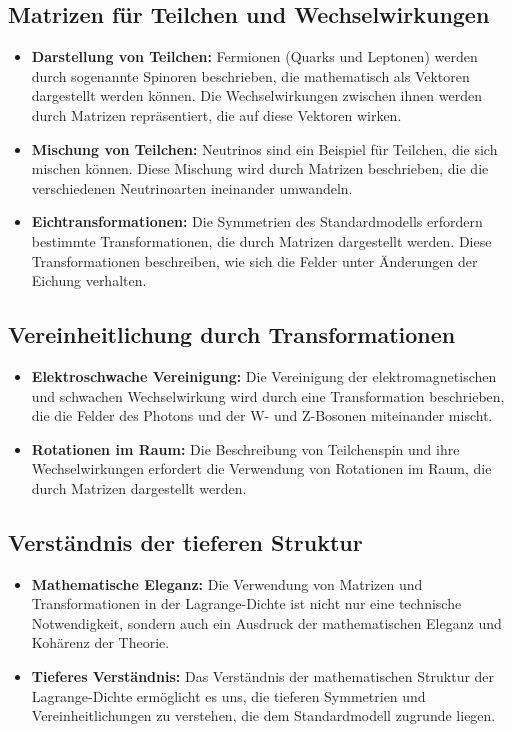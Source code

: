 \documentclass{article}
\begin{document}
	\subsection{Matrizen für Teilchen und Wechselwirkungen}
	
	\begin{itemize}
		\item \textbf{Darstellung von Teilchen:} Fermionen (Quarks und Leptonen) werden durch sogenannte Spinoren beschrieben, die mathematisch als Vektoren dargestellt werden können. Die Wechselwirkungen zwischen ihnen werden durch Matrizen repräsentiert, die auf diese Vektoren wirken.
		\item \textbf{Mischung von Teilchen:} Neutrinos sind ein Beispiel für Teilchen, die sich mischen können. Diese Mischung wird durch Matrizen beschrieben, die die verschiedenen Neutrinoarten ineinander umwandeln.
		\item \textbf{Eichtransformationen:} Die Symmetrien des Standardmodells erfordern bestimmte Transformationen, die durch Matrizen dargestellt werden. Diese Transformationen beschreiben, wie sich die Felder unter Änderungen der Eichung verhalten.
	\end{itemize}
	
	\subsection{Vereinheitlichung durch Transformationen}
	
	\begin{itemize}
		\item \textbf{Elektroschwache Vereinigung:} Die Vereinigung der elektromagnetischen und schwachen Wechselwirkung wird durch eine Transformation beschrieben, die die Felder des Photons und der W- und Z-Bosonen miteinander mischt.
		\item \textbf{Rotationen im Raum:} Die Beschreibung von Teilchenspin und ihre Wechselwirkungen erfordert die Verwendung von Rotationen im Raum, die durch Matrizen dargestellt werden.
	\end{itemize}
	
	\subsection{Verständnis der tieferen Struktur}
	
	\begin{itemize}
		\item \textbf{Mathematische Eleganz:} Die Verwendung von Matrizen und Transformationen in der Lagrange-Dichte ist nicht nur eine technische Notwendigkeit, sondern auch ein Ausdruck der mathematischen Eleganz und Kohärenz der Theorie.
		\item \textbf{Tieferes Verständnis:} Das Verständnis der mathematischen Struktur der Lagrange-Dichte ermöglicht es uns, die tieferen Symmetrien und Vereinheitlichungen zu verstehen, die dem Standardmodell zugrunde liegen.
	\end{itemize}
	
\end{document}
